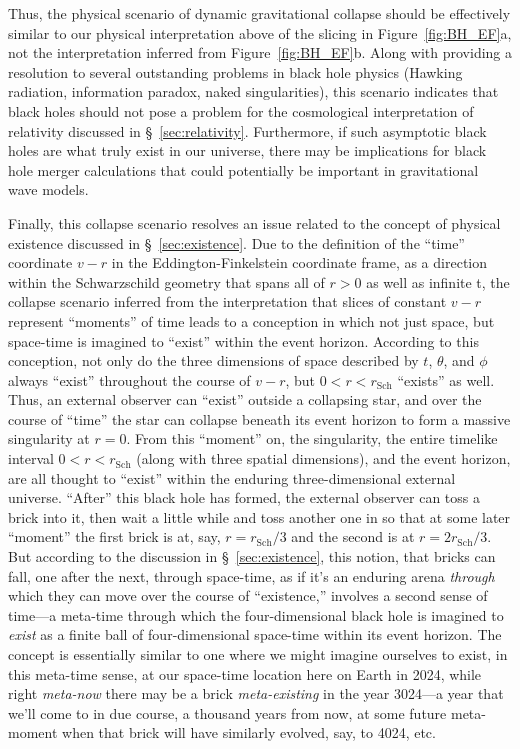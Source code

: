 \documentclass[aps,rmp,groupedaddress,twocolumn,10pt]{revtex4-2}
\begin{document}
Thus, the physical scenario of dynamic gravitational collapse should be effectively similar to our physical interpretation above of the slicing in Figure~\ref{fig:BH_EF}a, not the interpretation inferred from Figure~\ref{fig:BH_EF}b. Along with providing a resolution to several outstanding problems in black hole physics (Hawking radiation, information paradox, naked singularities), this scenario indicates that black holes should not pose a problem for the cosmological interpretation of relativity discussed in \S~\ref{sec:relativity}. Furthermore, if such asymptotic black holes are what truly exist in our universe, there may be implications for black hole merger calculations that could potentially be important in gravitational wave models.

Finally, this collapse scenario resolves an issue related to the concept of physical existence discussed in \S~\ref{sec:existence}. Due to the definition of the ``time'' coordinate $v-r$ in the Eddington-Finkelstein coordinate frame, as a direction within the Schwarzschild geometry that spans all of $r>0$ as well as infinite t, the collapse scenario inferred from the interpretation that slices of constant $v-r$ represent ``moments'' of time leads to a conception in which not just space, but space-time is imagined to ``exist'' within the event horizon. According to this conception, not only do the three dimensions of space described by $t$, $\theta$, and $\phi$ always ``exist'' throughout the course of $v-r$, but $0<r<r_{\mathrm{Sch}}$ ``exists'' as well. Thus, an external observer can ``exist'' outside a collapsing star, and over the course of ``time'' the star can collapse beneath its event horizon to form a massive singularity at $r=0$. From this ``moment'' on, the singularity, the entire timelike interval $0<r<r_{\mathrm{Sch}}$ (along with three spatial dimensions), and the event horizon, are all thought to ``exist'' within the enduring three-dimensional external universe. ``After'' this black hole has formed, the external observer can toss a brick into it, then wait a little while and toss another one in so that at some later ``moment'' the first brick is at, say, $r=r_{\mathrm{Sch}}/3$ and the second is at $r=2r_{\mathrm{Sch}}/3$. But according to the discussion in \S~\ref{sec:existence}, this notion, that bricks can fall, one after the next, through space-time, as if it's an enduring arena \textit{through} which they can move over the course of ``existence,'' involves a second sense of time---a meta-time through which the four-dimensional black hole is imagined to \textit{exist} as a finite ball of four-dimensional space-time within its event horizon. The concept is essentially similar to one where we might imagine ourselves to exist, in this meta-time sense, at our space-time location here on Earth in 2024, while right \textit{meta-now} there may be a brick \textit{meta-existing} in the year 3024---a year that we'll come to in due course, a thousand years from now, at some future meta-moment when that brick will have similarly evolved, say, to 4024, etc.
\end{document}
